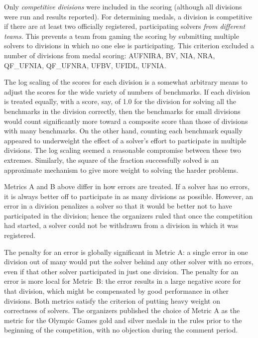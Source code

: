 \documentclass[twoside,11pt]{article}
\begin{document}
Only \emph{competitive divisions} were included in the scoring (although all divisions were run and results reported). For determining medals, a division is competitive if there are at least two officially registered, participating solvers \emph{from different teams}. This prevents a team from gaming the scoring by submitting multiple solvers to divisions in which no one else is participating. This criterion excluded a number of divisions from medal scoring: AUFNIRA, BV, NIA, NRA, QF\_UFNIA, QF\_UFNRA, UFBV, UFIDL, UFNIA.

The log scaling of the scores for each division is a somewhat arbitrary means to adjust the scores for the wide variety of numbers of benchmarks. If each division is treated equally, with a score, say, of 1.0 for the division for solving all the benchmarks in the division correctly, then the benchmarks for small divisions would count significantly more toward a composite score than those of divisions with many benchmarks. On the other hand, counting each benchmark equally appeared to underweight the effect of a solver's effort to participate in multiple divisions. The log scaling seemed a reasonable compromise between these two extremes. Similarly, the square of the fraction successfully solved is an approximate mechanism to give more weight to solving the harder problems.

Metrics A and B above differ in how errors are treated. If a solver has no errors, it is always better off to participate in as many divisions as possible. However, an error in a division penalizes a solver so that it would be better not to have participated in the division; hence the organizers ruled that once the competition had started, a solver could not be withdrawn from a division in which it was registered.

The penalty for an error is globally significant in Metric A: a single error in one division out of many would put the solver behind any other solver with no errors, even if that other solver participated in just one division. The penalty for an error is more local for Metric~B: the error results in a large negative score for that division, which might be compensated by good performance in other divisions. Both metrics satisfy the criterion of putting heavy weight on correctness of solvers.
The organizers published the choice of Metric A as the metric for the Olympic Games gold and silver medals in the rules prior to the beginning of the competition, with no objection during the comment period. 
\end{document}
